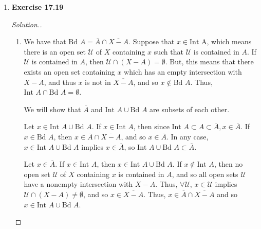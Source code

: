 \documentclass{article}
\newcommand{\T}{\mathcal{T}}
\newcommand{\U}{\mathcal{U}}
\newcommand{\R}{\mathbb{R}}
\newcommand{\sk}{\smallskip}
\begin{document}
\begin{enumerate}
\begin{proof}[Solution.]
        \underline{$\T_4$: Upper limit topology}
        \begin{enumerate}
            \item Since $\T_2$ is coarser than $\T_4$, $\R - K \in \T_2 \implies \R - K \in \T_4$. So, $K^c = \R - K$ is open in $\T_4$, so $K$ is closed, and $\overline{K} = K$. 
    
            \item Since $\T_2$ is coarser than $\T_4$ and $\T_2$ satisfies the Hausdorff axiom, $\T_4$ also satisfies the Hausdorff axiom. Since $\T_4$ satisfies the Hausdorff axiom, it satisfies the $T_1$ axiom. 
        \end{enumerate}
    \end{proof}

    \item 
    \textbf{Exercise 17.19}
    \begin{proof}[Solution.]
        \begin{enumerate}
            \item We have that $\text{Bd }A = \overline{A} \cap \overline{X - A}$. Suppose that $x \in \text{Int A}$, which means there is an open set $\U$ of $X$ containing $x$ such that $\U$ is contained in $A$. If $\U$ is contained in $A$, then $\U \cap (X - A) = \emptyset$. But, this means that there exists an open set containing $x$ which has an empty intersection with $X - A$, and thus $x$ is not in $\overline{X - A}$, and so $x \notin \text{Bd }A$. Thus, $\text{Int }A \cap \text{Bd }A = \emptyset$. 

            \sk 

            We will show that $\overline{A}$ and $\text{Int }A \cup \text{Bd }A$ are subsets of each other.

            \sk 

            Let $x \in \text{Int }A \cup \text{Bd }A$. If $x \in \text{Int }A$, then since $\text{Int }A \subset A \subset \overline{A}, x \in \overline{A}$. If $x \in \text{Bd }A$, then $x \in \overline{A} \cap \overline{X - A}$, and so $x \in \overline{A}$. In any case, $x \in \text{Int }A \cup \text{Bd }A$ implies $x \in \overline{A}$, so $\text{Int }A \cup \text{Bd }A \subset \overline{A}$. 

            \sk 

            Let $x \in \overline{A}$. If $x \in \text{Int }A$, then $x \in \text{Int }A \cup \text{Bd }A$. If $x \notin \text{Int }A$, then no open set $\U$ of $X$ containing $x$ is contained in $A$, and so all open sets $\U$ have a nonempty intersection with $X - A$. Thus, $\forall \U$, $x \in \U$ implies $\U \cap (X - A) \neq \emptyset$, and so $x \in \overline{X - A}$. Thus, $x \in \overline{A} \cap \overline{X - A}$ and so $x \in \text{Int }A \cup \text{Bd }A$. 


\end{enumerate}
\end{proof}
\end{enumerate}
\end{document}
